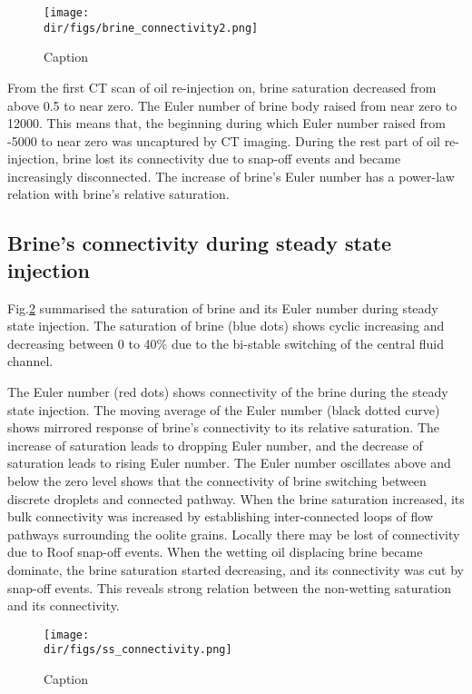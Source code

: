 \begin{figure}
    \centering
    \texttt{[image: \\dir/figs/brine\_connectivity2.png]}
    \caption{Caption}   
    \label{brine_connectivity2}
\end{figure}

From the first CT scan of oil re-injection on, brine saturation decreased from above 0.5 to near zero. The Euler number of brine body raised from near zero to 12000. This means that, the beginning during which Euler number raised from -5000 to near zero was uncaptured by CT imaging. During the rest part of oil re-injection, brine lost its connectivity due to snap-off events and became increasingly disconnected. The increase of brine's Euler number has a power-law relation with brine's relative saturation.

\subsection{Brine's connectivity during steady state injection}
Fig.\ref{ss_connectivity} summarised the saturation of brine and its Euler number during steady state injection. The saturation of brine (blue dots) shows cyclic increasing and decreasing between 0 to 40\% due to the bi-stable switching of the central fluid channel.

The Euler number (red dots) shows connectivity of the brine during the steady state injection. The moving average of the Euler number (black dotted curve) shows mirrored response of brine's connectivity to its relative saturation. The increase of saturation leads to dropping Euler number, and the decrease of saturation leads to rising Euler number. The Euler number oscillates above and below the zero level shows that the connectivity of brine switching between discrete droplets and connected pathway. When the brine saturation increased, its bulk connectivity was increased by establishing inter-connected loops of flow pathways surrounding the oolite grains. Locally there may be lost of connectivity due to Roof snap-off events. When the wetting oil displacing brine became dominate, the brine saturation started decreasing, and its connectivity was cut by snap-off events. This reveals strong relation between the non-wetting saturation and its connectivity.

\begin{figure}
    \centering
    \texttt{[image: \\dir/figs/ss\_connectivity.png]}
    \caption{Caption}   
    \label{ss_connectivity}
\end{figure}

